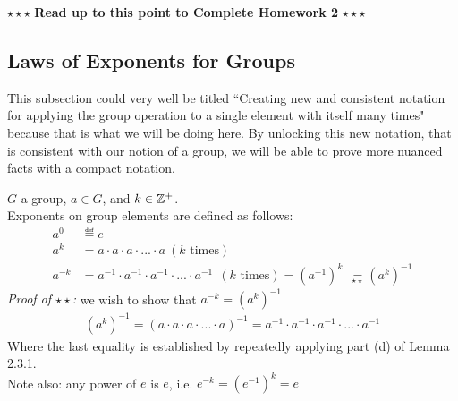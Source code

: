 \begin{tcolorbox}
\begin{center}
    $\star\star\star$ \textbf{Read up to this point to Complete Homework 2} $\star\star\star$
\end{center}
\end{tcolorbox}
\newpage
\subsection{Laws of Exponents for Groups } This subsection could very well be titled ``Creating new and consistent notation for applying the group operation to a single element with itself many times" because that is what we will be doing here. By unlocking this new notation, that is consistent with our notion of a group, we will be able to prove more nuanced facts with a compact notation.\steezybreak
\begin{definition}
\noindent $G$ a group, $a\in G$, and $k\in {\mathbb{ Z}}^+$. \\
Exponents on group elements are defined as follows:
\begin{align}
    a^{0} & \eqdef e \nonumber \\
    a^{k} &= a\cdot a\cdot a \cdot ... \cdot a \ (  k \text{ times} )\nonumber \\
    a^{-k} &= a^{-1}\cdot a^{-1} \cdot a^{-1} \cdot ... \cdot a^{-1} \ \ ( k \text{ times}) = (a^{-1})^k\ \  \underset{\star\star}{=} (a^{k})^{-1} \nonumber
\end{align}
\textit{Proof of $\star\star$:} we wish to show that $a^{-k}=(a^{k})^{-1}$ 
\begin{align}
    (a^k)^{-1}=(a\cdot a\cdot a \cdot ... \cdot a)^{-1} = a^{-1}\cdot a^{-1}\cdot a^{-1} \cdot ... \cdot a^{-1}\nonumber 
\end{align}
Where the last equality is established by repeatedly applying part (d) of Lemma 2.3.1. \steezybreak\\
Note also: any power of $e$ is $e$, i.e. $e^{-k}=(e^{-1})^k=e$
\end{definition}

